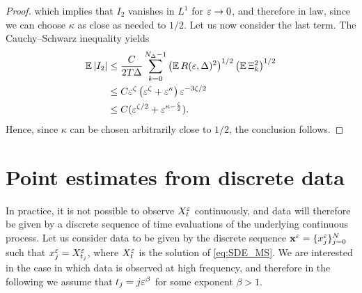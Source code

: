 \documentclass[10pt]{article}
\begin{document}
\begin{proof}
	which implies that $I_2$ vanishes in $L^1$ for $\varepsilon \to 0$, and therefore in law, since we can choose $\kappa$ as close as needed to $1/2$. Let us now consider the last term. The Cauchy--Schwarz inequality yields
	\begin{equation}
	\begin{aligned}
		\operatorname{\mathbb{E}}\left\lvert I_2\right\rvert &\leq \frac{C}{2T\Delta} \sum_{k=0}^{N_\Delta-1} \left(\operatorname{\mathbb{E}} R(\varepsilon, \Delta)^2\right)^{1/2} \left(\operatorname{\mathbb{E}} \Xi_k^2\right)^{1/2} \\
		&\leq C \varepsilon^\zeta \left(\varepsilon^\zeta + \varepsilon^\kappa\right) \varepsilon^{-3\zeta/2}\\
		&\leq C (\varepsilon^{\zeta/2} + \varepsilon^{\kappa - \frac{\zeta}{2}}).
	\end{aligned}
	\end{equation}
	Hence, since $\kappa$ can be chosen arbitrarily close to $1/2$, the conclusion follows.
\end{proof}


\section{Point estimates from discrete data}

In practice, it is not possible to observe $X_t^\varepsilon$ continuously, and data will therefore be given by a discrete sequence of time evaluations of the underlying continuous process. Let us consider data to be given by the discrete sequence $\mathbf x^\varepsilon = \{x^\varepsilon_j\}_{j=0}^N$ such that $x^\varepsilon_j = X_{t_j}^\varepsilon$, where $X_t^\varepsilon$ is the solution of \eqref{eq:SDE_MS}. We are interested in the case in which data is observed at high frequency, and therefore in the following we assume that $t_j = j\varepsilon^\beta$ for some exponent $\beta > 1$. 
\end{document}
